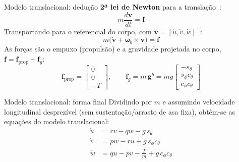\documentclass[aspectratio=169,11pt]{beamer}
\begin{document}
\begin{frame}{Modelo translacional: dedução}
  \textbf{2ª lei de Newton} para a translação~\cite{Beard2012,Graesdal2021}:
  \begin{equation}m\frac{d\mathbf{v}}{dt}=\mathbf{f}\tag{2.25}\end{equation}
  Transportando para o referencial do corpo, com $\dot{\mathbf{v}}=[\dot u,\dot v,\dot w]^{\top}$:
  \begin{equation}m\big(\dot{\mathbf{v}}+\boldsymbol\omega_b\times\mathbf{v}\big)=\mathbf{f}\tag{2.26}\end{equation}
  As forças são o empuxo (propulsão) e a gravidade projetada no corpo, $\mathbf{f}=\mathbf{f}_{\text{prop}}+\mathbf{f}_{g}$:
  \begin{equation} \mathbf{f}_{\text{prop}}=\begin{bmatrix}0\\0\\-T\end{bmatrix}, \qquad
     \mathbf{f}_{g}=m\,\mathbf{g}^{b}=mg\begin{bmatrix}-s_\theta\\ s_\phi c_\theta\\ c_\phi c_\theta\end{bmatrix} \tag{2.27}\end{equation}
\end{frame}

\begin{frame}{Modelo translacional: forma final}
  Dividindo por $m$ e assumindo velocidade longitudinal desprezível (sem sustentação/arrasto de asa fixa), obtêm-se as equações do modelo translacional:
  \begin{align*}
    \dot{u} &= rv - qw - g\,s_\theta \tag{2.29}\\
    \dot{v} &= pw - ru + g\,s_\phi c_\theta \tag{2.30}\\
    \dot{w} &= qu - pv - \tfrac{T}{m} + g\,c_\phi c_\theta \tag{2.31}
  \end{align*}
\end{frame}
\end{document}
